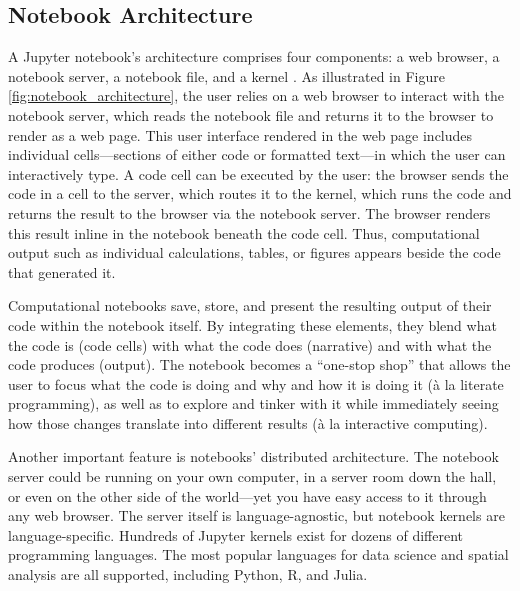 \documentclass[11pt,letterpaper]{article}
\begin{document}
\subsection{Notebook Architecture}

A Jupyter notebook's architecture comprises four components: a web browser, a notebook server, a notebook file, and a kernel \citep{kluyver_jupyter_2016}. As illustrated in Figure \ref{fig:notebook_architecture}, the user relies on a web browser to interact with the notebook server, which reads the notebook file and returns it to the browser to render as a web page. This user interface rendered in the web page includes individual cells---sections of either code or formatted text---in which the user can interactively type. A code cell can be executed by the user: the browser sends the code in a cell to the server, which routes it to the kernel, which runs the code and returns the result to the browser via the notebook server. The browser renders this result inline in the notebook beneath the code cell. Thus, computational output such as individual calculations, tables, or figures appears beside the code that generated it.

Computational notebooks save, store, and present the resulting output of their code within the notebook itself. By integrating these elements, they blend what the code is (code cells) with what the code does (narrative) and with what the code produces (output). The notebook becomes a \enquote{one-stop shop} that allows the user to focus what the code is doing and why and how it is doing it (à la literate programming), as well as to explore and tinker with it while immediately seeing how those changes translate into different results (à la interactive computing).

Another important feature is notebooks' distributed architecture. The notebook server could be running on your own computer, in a server room down the hall, or even on the other side of the world---yet you have easy access to it through any web browser. The server itself is language-agnostic, but notebook kernels are language-specific. Hundreds of Jupyter kernels exist for dozens of different programming languages. The most popular languages for data science and spatial analysis are all supported, including Python, R, and Julia.
\end{document}

